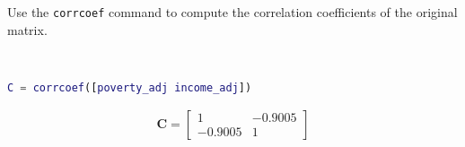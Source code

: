 Use the \texttt{corrcoef} command to compute the correlation coefficients of the original matrix.

\begin{solution} \
    \begin{lstlisting}[language=Matlab]
C = corrcoef([poverty_adj income_adj])
    \end{lstlisting}
    
    \begin{align*}
        \boldsymbol{C} = \begin{bmatrix}
            1 & -0.9005 \\
            -0.9005 & 1
        \end{bmatrix}
    \end{align*}
\end{solution}